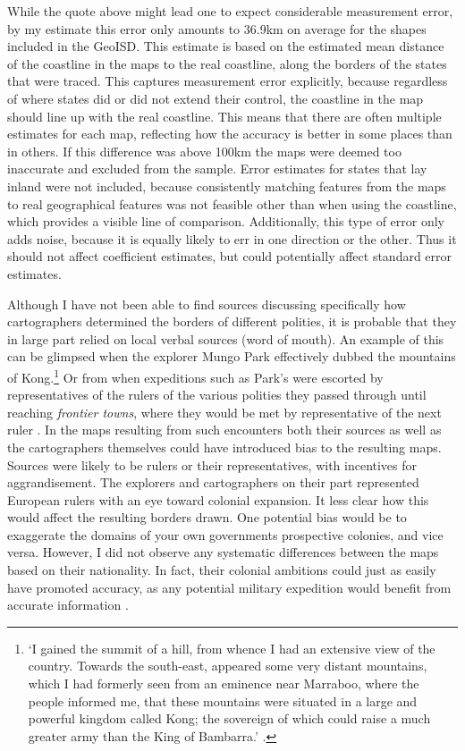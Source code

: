 \documentclass[12pt]{article}
\begin{document}
While the quote above might lead one to expect considerable measurement error,
by my estimate this error only amounts to 36.9km on average for the shapes
included in the GeoISD. This estimate is based on the estimated mean distance of
the coastline in the maps to the real coastline, along the borders of the states
that were traced. This captures measurement error explicitly, because regardless
of where states did or did not extend their control, the coastline in the map
should line up with the real coastline. This means that there are often multiple
estimates for each map, reflecting how the accuracy is better in some places
than in others. If this difference was above 100km the maps were deemed too
inaccurate and excluded from the sample. Error estimates for states that lay
inland were not included, because consistently matching features from the maps
to real geographical features was not feasible other than when using the
coastline, which provides a visible line of comparison. Additionally, this type
of error only adds noise, because it is equally likely to err in one direction
or the other. Thus it should not affect coefficient estimates, but could
potentially affect standard error estimates.

Although I have not been able to find sources discussing specifically how
cartographers determined the borders of different polities, it is probable that
they in large part relied on local verbal sources (word of mouth). An example of
this can be glimpsed when the explorer Mungo Park effectively dubbed the
mountains of Kong.\footnote{`I gained the summit of a hill, from whence I had an
	extensive view of the country. Towards the south-east, appeared some
	very distant mountains, which I had formerly seen from an eminence near
	Marraboo, where the people informed me, that these mountains were
	situated in a large and powerful kingdom called Kong; the sovereign of
	which could raise a much greater army than the King of Bambarra.'
\citep[CHAPTER XVIII]{ParkMungo2015Titi}.} Or from when expeditions such as
Park's were escorted by representatives of the rulers of the various polities
they passed through until reaching \textit{frontier towns}, where they would be
met by representative of the next ruler \citep{ParkMungo2015Titi}. In the maps
resulting from such encounters both their sources as well as the cartographers
themselves could have introduced bias to the resulting maps. Sources were likely
to be rulers or their representatives, with incentives for aggrandisement. The
explorers and cartographers on their part represented European rulers with an
eye toward colonial expansion. It less clear how this would affect the resulting
borders drawn. One potential bias would be to exaggerate the domains of your own
governments prospective colonies, and vice versa. However, I did not observe any
systematic differences between the maps based on their nationality. In fact,
their colonial ambitions could just as easily have promoted accuracy, as any
potential military expedition would benefit from accurate information
\citep{Bassett_1994}.
\end{document}
